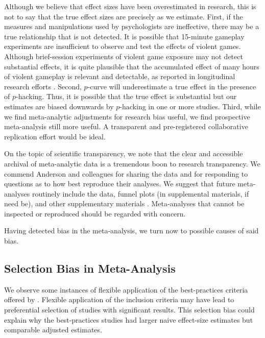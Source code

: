 \documentclass[man]{apa6}
\begin{document}
Although we believe that effect sizes have been overestimated in research, this is not to say that the true effect sizes are precisely as we estimate. First, if the measures and manipulations used by psychologists are ineffective, there may be a true relationship that is not detected. It is possible that 15-minute gameplay experiments are insufficient to observe and test the effects of violent games. Although brief-session experiments of violent game exposure may not detect substantial effects, it is quite plausible that the accumulated effect of many hours of violent gameplay is relevant and detectable, as reported in longitudinal research efforts \citep[e.g.,]{Willoughby:etal:2014}. Second, $p$-curve will underestimate a true effect in the presence of $p$-hacking. Thus, it is possible that the true effect is substantial but our estimates are biased downwards by $p$-hacking in one or more studies. Third, while we find meta-analytic adjustments for research bias useful, we find prospective meta-analysis still more useful. A transparent and pre-registered collaborative replication effort would be ideal.

On the topic of scientific transparency, we note that the clear and accessible archival of meta-analytic data is a tremendous boon to research transparency. We commend Anderson and colleagues for sharing the data and for responding to questions as to how best reproduce their analyses. We suggest that future meta-analyses routinely include the data, funnel plots (in supplemental materials, if need be), and other supplementary materials \citep{Lakens:etal:2015}. Meta-analyses that cannot be inspected or reproduced should be regarded with concern.

Having detected bias in the meta-analysis, we turn now to possible causes of said bias.

\subsection{Selection Bias in Meta-Analysis} 
We observe some instances of flexible application of the best-practices criteria offered by \citet{Anderson:etal:2010}. Flexible application of the inclusion criteria may have lead to preferential selection of studies with significant results. This selection bias could explain why the best-practices studies had larger naive effect-size estimates but comparable adjusted estimates.
\end{document}
